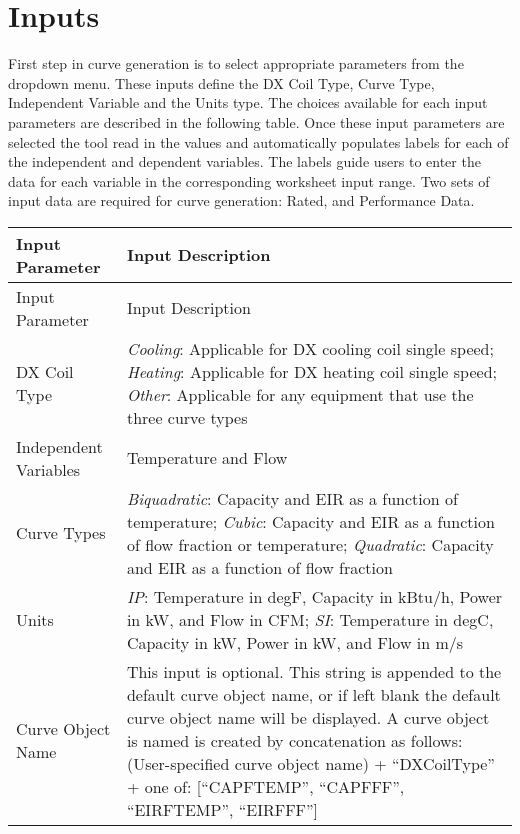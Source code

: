 \section{Inputs}\label{inputs}

First step in curve generation is to select appropriate parameters from the dropdown menu. These inputs define the DX Coil Type, Curve Type, Independent Variable and the Units type. The choices available for each input parameters are described in the following table. Once these input parameters are selected the tool read in the values and automatically populates labels for each of the independent and dependent variables. The labels guide users to enter the data for each variable in the corresponding worksheet input range. Two sets of input data are required for curve generation: Rated, and Performance Data.

\begin{longtable}{p{2in}|p{4in}}

\toprule
Input Parameter & Input Description \tabularnewline
\midrule
\endfirsthead

\toprule
Input Parameter & Input Description \tabularnewline
\midrule
\endhead 
DX Coil Type & \emph{Cooling}: Applicable for DX cooling coil single speed; 
               \emph{Heating}: Applicable for DX heating coil single speed; 
               \emph{Other}: Applicable for any equipment that use the three curve types
\tabularnewline
Independent Variables & Temperature and Flow 
\tabularnewline
Curve Types & \emph{Biquadratic}: Capacity and EIR as a function of temperature;
              \emph{Cubic}: Capacity and EIR as a function of flow fraction or temperature;
              \emph{Quadratic}: Capacity and EIR as a function of flow fraction
\tabularnewline
Units & \emph{IP}: Temperature in degF, Capacity in kBtu/h, Power in kW, and Flow in CFM;
        \emph{SI}: Temperature in degC, Capacity in kW, Power in kW, and Flow in m/s
\tabularnewline
Curve Object Name & This input is optional. This string is appended to the default curve object name, or if left blank the default curve object name will be displayed. A curve object is named is created by concatenation as follows: (User-specified curve object name) + ``DXCoilType'' + one of: [``CAPFTEMP'', ``CAPFFF'', ``EIRFTEMP'', ``EIRFFF'']\tabularnewline
\bottomrule
\end{longtable}
